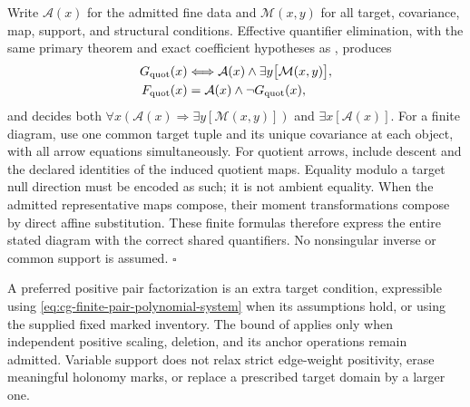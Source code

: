 Write \(\mathcal A(x)\) for the admitted fine data
and \(\mathcal M(x,y)\) for all target, covariance,
map, support, and structural conditions. Effective
quantifier elimination, with the same primary theorem
and exact coefficient hypotheses as
, produces
\begin{equation}
\begin{aligned}
G_{\rm quot}(x)&\Longleftrightarrow
\mathcal A(x)\wedge\exists y\bigl[\mathcal M(x,y)\bigr],\\
F_{\rm quot}(x)&=\mathcal A(x)\wedge\neg G_{\rm quot}(x),
\end{aligned}
\label{eq:cg-variable-support-good-locus}
\end{equation}
and decides both
\(\forall x(\mathcal A(x)\Rightarrow
\exists y[\mathcal M(x,y)])\) and
\(\exists x[\mathcal A(x)]\).
For a finite diagram, use one common target tuple
and its unique covariance at each object, with all
arrow equations simultaneously. For quotient arrows,
include descent and the declared identities of the
induced quotient maps. Equality modulo a target
null direction must be encoded as such; it is not
ambient equality. When the admitted representative
maps compose, their moment transformations compose
by direct affine substitution. These finite formulas
therefore express the entire stated diagram with
the correct shared quantifiers. No nonsingular
inverse or common support is assumed.
\(\square\)

A preferred positive pair factorization is an extra
target condition, expressible using
\eqref{eq:cg-finite-pair-polynomial-system} when its
assumptions hold, or using the supplied fixed marked
inventory. The bound of
 applies
only when independent positive scaling, deletion,
and its anchor operations remain admitted.
Variable support does not relax strict edge-weight
positivity, erase meaningful holonomy marks, or
replace a prescribed target domain by a larger one.

